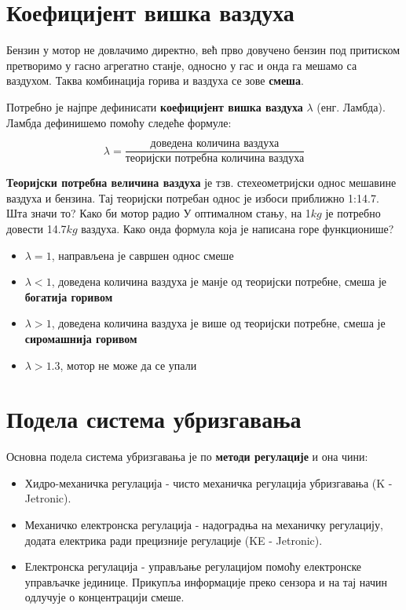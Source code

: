\documentclass{report}
\begin{document}
\section{Коефицијент вишка ваздуха}

Бензин у мотор не довлачимо директно, већ прво довучено бензин под притиском претворимо у 
гасно агрегатно станје, односно у гас и онда  га мешамо са ваздухом. Таква комбинација горива
и ваздуха се зове \textbf{смеша}.

Потребно је најпре дефинисати \textbf{коефицијент вишка ваздуха} $\lambda$ (енг. Ламбда). 
Ламбда дефинишемо помоћу следеће формуле: 

\begin{equation}
    \lambda = \frac{\text{доведена количина ваздуха}}{\text{теоријски потребна количина ваздуха}}
\end{equation}

\textbf{Теоријски потребна величина ваздуха} је тзв. стехеометријски однос мешавине ваздуха и бензина.
Тај теоријски потребан однос је избоси приближно 1:14.7. Шта значи то? Како би мотор радио У
оптималном стању, на 1$kg$ је потребно довести 14.7$kg$ ваздуха. Како онда формула која је написана 
горе функционише? 

\begin{itemize}
    \item $\lambda = 1$, направљена је савршен однос смеше
    \item $\lambda < 1$, доведена количина ваздуха је манје од теоријски потребне, смеша је \textbf{богатија горивом}
    \item $\lambda > 1$, доведена количина ваздуха је више од теоријски потребне, смеша је \textbf{сиромашнија горивом}
    \item $\lambda > 1.3$, мотор не може да се упали
\end{itemize}

\section{Подела система убризгавања}

Основна подела система убризгавања је по \textbf{методи регулације} и она чини: 

\begin{itemize}
    \item Хидро-механичка регулација - чисто механичка регулација убризгавања (K - Jetronic).
    \item Механичко електронска регулација - надоградња на механичку регулацију, додата
            електрика ради прецизније регулације (KE - Jetronic).
    \item Електронска регулација - управљање регулацијом помоћу електронске управљачке 
            јединице. Прикупља информације преко сензора и на тај начин одлучује о 
            концентрацији смеше.
\end{itemize}
\end{document}
